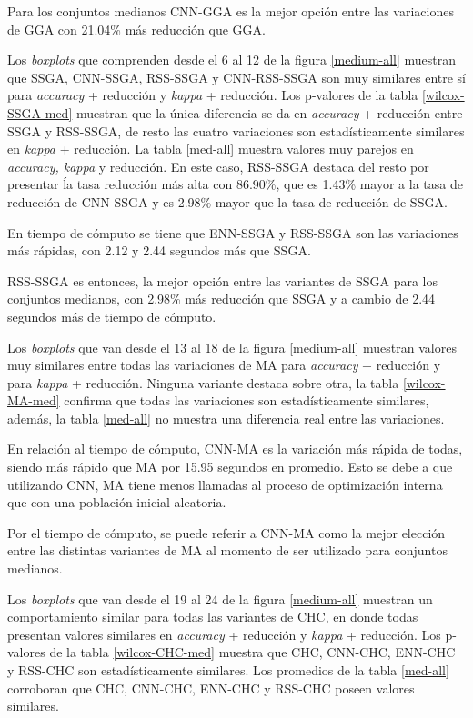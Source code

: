 Para los conjuntos medianos CNN-GGA es la mejor opción entre las variaciones de GGA con 21.04\% más reducción que GGA.

Los \emph{boxplots} que comprenden desde el 6 al 12 de la figura \ref{medium-all} muestran que SSGA, CNN-SSGA, RSS-SSGA y CNN-RSS-SSGA son muy similares entre sí para \emph{accuracy} + reducción y \emph{kappa} + reducción. Los p-valores de la tabla \ref{wilcox-SSGA-med} muestran que la única diferencia se da en \emph{accuracy} + reducción entre SSGA y RSS-SSGA, de resto las cuatro variaciones son estadísticamente similares en \emph{kappa} + reducción. La tabla \ref{med-all} muestra valores muy parejos en \emph{accuracy, kappa} y reducción. En este caso, RSS-SSGA destaca del resto por presentar ĺa tasa reducción más alta con 86.90\%, que es 1.43\% mayor a la tasa de reducción de CNN-SSGA y es 2.98\% mayor que la tasa de reducción de SSGA.

En tiempo de cómputo se tiene que ENN-SSGA y RSS-SSGA son las variaciones más rápidas, con 2.12 y 2.44 segundos más que SSGA.

RSS-SSGA es entonces, la mejor opción entre las variantes de SSGA para los conjuntos medianos, con 2.98\% más reducción que SSGA y a cambio de 2.44 segundos más de tiempo de cómputo.

Los \emph{boxplots} que van desde el 13 al 18 de la figura \ref{medium-all} muestran valores muy similares entre todas las variaciones de MA para \emph{accuracy} + reducción y para \emph{kappa} + reducción. Ninguna variante destaca sobre otra, la tabla \ref{wilcox-MA-med} confirma que todas las variaciones son estadísticamente similares, además, la tabla  \ref{med-all}  no muestra una diferencia real entre las variaciones.

En relación al tiempo de cómputo, CNN-MA es la variación más rápida de todas, siendo más rápido que MA por 15.95 segundos en promedio. Esto se debe a que utilizando CNN, MA tiene menos llamadas al proceso de optimización interna que con una población inicial aleatoria.

Por el tiempo de cómputo, se puede referir a CNN-MA como la mejor elección entre las distintas variantes de MA al momento de ser utilizado para conjuntos medianos.

Los \emph{boxplots} que van desde el 19 al 24 de la figura \ref{medium-all} muestran un comportamiento similar para todas las variantes de CHC, en donde todas presentan valores similares en \emph{accuracy} + reducción y \emph{kappa} + reducción. Los p-valores de la tabla \ref{wilcox-CHC-med} muestra que CHC, CNN-CHC, ENN-CHC y RSS-CHC son estadísticamente similares. Los promedios de la tabla \ref{med-all} corroboran que CHC, CNN-CHC, ENN-CHC y RSS-CHC poseen valores similares.

